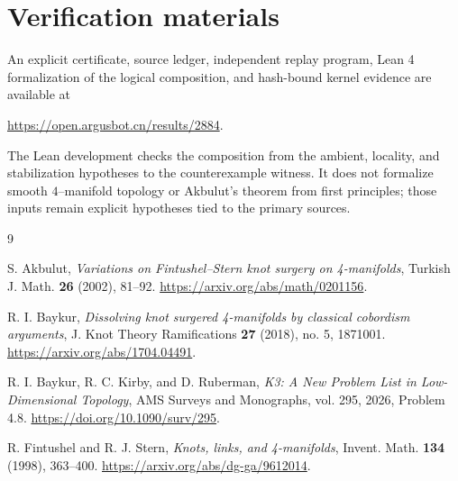 \documentclass[11pt]{article}
\theoremstyle{remark}
\begin{document}
\section{Verification materials}

An explicit certificate, source ledger, independent replay program, Lean 4
formalization of the logical composition, and hash-bound kernel evidence are
available at
\begin{center}
  \url{https://open.argusbot.cn/results/2884}.
\end{center}
The Lean development checks the composition from the ambient, locality, and
stabilization hypotheses to the counterexample witness.  It does not
formalize smooth $4$--manifold topology or Akbulut's theorem from first
principles; those inputs remain explicit hypotheses tied to the primary
sources.

\begin{thebibliography}{9}

S. Akbulut,
\emph{Variations on Fintushel--Stern knot surgery on 4-manifolds},
Turkish J. Math. \textbf{26} (2002), 81--92.
\url{https://arxiv.org/abs/math/0201156}.

R. I. Baykur,
\emph{Dissolving knot surgered 4-manifolds by classical cobordism arguments},
J. Knot Theory Ramifications \textbf{27} (2018), no. 5, 1871001.
\url{https://arxiv.org/abs/1704.04491}.

R. I. Baykur, R. C. Kirby, and D. Ruberman,
\emph{K3: A New Problem List in Low-Dimensional Topology},
AMS Surveys and Monographs, vol. 295, 2026, Problem 4.8.
\url{https://doi.org/10.1090/surv/295}.

R. Fintushel and R. J. Stern,
\emph{Knots, links, and 4-manifolds},
Invent. Math. \textbf{134} (1998), 363--400.
\url{https://arxiv.org/abs/dg-ga/9612014}.

\end{thebibliography}
\end{document}
